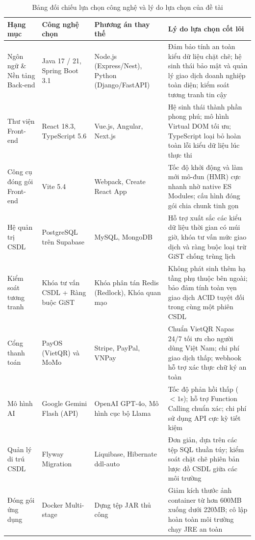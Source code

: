 \begin{table}[H]
\centering
\caption{Bảng đối chiếu lựa chọn công nghệ và lý do lựa chọn của đề tài}
\label{tab:lua_chon_congnghe}
\small
\renewcommand{\arraystretch}{1.2}
\begin{tabular}{|p{2.3cm}|p{2.7cm}|p{3.0cm}|p{6.0cm}|}
\hline
\textbf{Hạng mục} & \textbf{Công nghệ chọn} & \textbf{Phương án thay thế} & \textbf{Lý do lựa chọn cốt lõi} \\
\hline
Ngôn ngữ \& Nền tảng Back-end & Java 17 / 21, Spring Boot 3.1 & Node.js (Express/Nest), Python (Django/FastAPI) & Đảm bảo tính an toàn kiểu dữ liệu chặt chẽ; hệ sinh thái bảo mật và quản lý giao dịch doanh nghiệp toàn diện; kiểm soát tương tranh tin cậy \\
\hline
Thư viện Front-end & React 18.3, TypeScript 5.6 & Vue.js, Angular, Next.js & Hệ sinh thái thành phần phong phú; mô hình Virtual DOM tối ưu; TypeScript loại bỏ hoàn toàn lỗi kiểu dữ liệu lúc thực thi \\
\hline
Công cụ đóng gói Front-end & Vite 5.4 & Webpack, Create React App & Tốc độ khởi động và làm mới mô-đun (HMR) cực nhanh nhờ native ES Modules; cấu hình đóng gói chia chunk tinh gọn \\
\hline
Hệ quản trị CSDL & PostgreSQL trên Supabase & MySQL, MongoDB & Hỗ trợ xuất sắc các kiểu dữ liệu thời gian có múi giờ, khóa tư vấn mức giao dịch và ràng buộc loại trừ GiST chống trùng lịch \\
\hline
Kiểm soát tương tranh & Khóa tư vấn CSDL + Ràng buộc GiST & Khóa phân tán Redis (Redlock), Khóa quan mạo & Không phát sinh thêm hạ tầng phụ thuộc bên ngoài; bảo đảm tính toàn vẹn giao dịch ACID tuyệt đối trong cùng một phiên CSDL \\
\hline
Cổng thanh toán & PayOS (VietQR) và MoMo & Stripe, PayPal, VNPay & Chuẩn VietQR Napas 24/7 tối ưu cho người dùng Việt Nam; chi phí giao dịch thấp; webhook hỗ trợ xác thực chữ ký an toàn \\
\hline
Mô hình AI & Google Gemini Flash (API) & OpenAI GPT-4o, Mô hình cục bộ Llama & Tốc độ phản hồi thấp ($<1$s); hỗ trợ Function Calling chuẩn xác; chi phí sử dụng API cực kỳ tiết kiệm \\
\hline
Quản lý di trú CSDL & Flyway Migration & Liquibase, Hibernate ddl-auto & Đơn giản, dựa trên các tệp SQL thuần túy; kiểm soát chặt chẽ phiên bản lược đồ CSDL giữa các môi trường \\
\hline
Đóng gói ứng dụng & Docker Multi-stage & Dựng tệp JAR thủ công & Giảm kích thước ảnh container từ hơn 600MB xuống dưới 220MB; cô lập hoàn toàn môi trường chạy JRE an toàn \\
\hline
\end{tabular}
\end{table}
